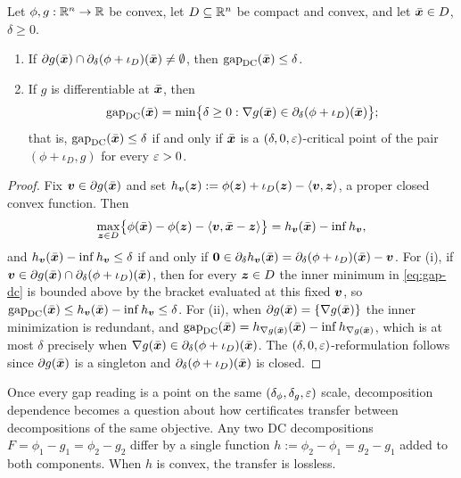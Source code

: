 \begin{lemma}
\label{lem:gap-dc-slice}
Let $\phi,g:\mathbb{R}^n\to\mathbb{R}$ be convex, let $D\subseteq\mathbb{R}^n$ be compact
and convex, and let $\bar{\bm{x}}\in D$, $\delta\ge0$.
\begin{enumerate}
    \item If
    $\partial g(\bar{\bm{x}})\cap\partial_\delta(\phi+\iota_D)(\bar{\bm{x}})
    \neq\emptyset$, then
    $\operatorname{gap}_{\mathrm{DC}}(\bar{\bm{x}})\le\delta$.
    \item If $g$ is differentiable at $\bar{\bm{x}}$, then
    \[
        \operatorname{gap}_{\mathrm{DC}}(\bar{\bm{x}})
        =\min\bigl\{\delta\ge0:
        \nabla g(\bar{\bm{x}})\in\partial_\delta(\phi+\iota_D)(\bar{\bm{x}})\bigr\};
    \]
    that is, $\operatorname{gap}_{\mathrm{DC}}(\bar{\bm{x}})\le\delta$ if and
    only if $\bar{\bm{x}}$ is a $(\delta,0,\varepsilon)$-critical point of the pair
    $(\phi+\iota_D,g)$ for every $\varepsilon>0$.
\end{enumerate}
\end{lemma}

\begin{proof}
Fix $\bm{v}\in\partial g(\bar{\bm{x}})$ and set
$h_{\bm{v}}(\bm{z}):=\phi(\bm{z})+\iota_D(\bm{z})-\langle\bm{v},\bm{z}\rangle$, a proper
closed convex function. Then
\[
    \max_{\bm{z}\in D}
    \bigl\{\phi(\bar{\bm{x}})-\phi(\bm{z})-\langle\bm{v},\bar{\bm{x}}-\bm{z}\rangle\bigr\}
    =h_{\bm{v}}(\bar{\bm{x}})-\inf h_{\bm{v}},
\]
and $h_{\bm{v}}(\bar{\bm{x}})-\inf h_{\bm{v}}\le\delta$ if and only if
$\bm{0}\in\partial_\delta h_{\bm{v}}(\bar{\bm{x}})
=\partial_\delta(\phi+\iota_D)(\bar{\bm{x}})-\bm{v}$. For (i), if
$\bm{v}\in\partial g(\bar{\bm{x}})\cap\partial_\delta(\phi+\iota_D)(\bar{\bm{x}})$,
then for every $\bm{z}\in D$ the inner minimum in \eqref{eq:gap-dc} is
bounded above by the bracket evaluated at this fixed $\bm{v}$, so
$\operatorname{gap}_{\mathrm{DC}}(\bar{\bm{x}})
\le h_{\bm{v}}(\bar{\bm{x}})-\inf h_{\bm{v}}\le\delta$. For (ii), when
$\partial g(\bar{\bm{x}})=\{\nabla g(\bar{\bm{x}})\}$ the inner minimization is
redundant, and
$\operatorname{gap}_{\mathrm{DC}}(\bar{\bm{x}})
=h_{\nabla g(\bar{\bm{x}})}(\bar{\bm{x}})-\inf h_{\nabla g(\bar{\bm{x}})}$, which is at
most $\delta$ precisely when
$\nabla g(\bar{\bm{x}})\in\partial_\delta(\phi+\iota_D)(\bar{\bm{x}})$. The
$(\delta,0,\varepsilon)$-reformulation follows since $\partial g(\bar{\bm{x}})$ is
a singleton and $\partial_\delta(\phi+\iota_D)(\bar{\bm{x}})$ is closed.
\end{proof}

Once every gap reading is a point on the same
$(\delta_\phi,\delta_g,\varepsilon)$ scale, decomposition dependence becomes a
question about how certificates transfer between decompositions of the
same objective. Any two DC decompositions $F=\phi_1-g_1=\phi_2-g_2$
differ by a single function $h:=\phi_2-\phi_1=g_2-g_1$ added to both
components. When $h$ is convex, the transfer is lossless.

